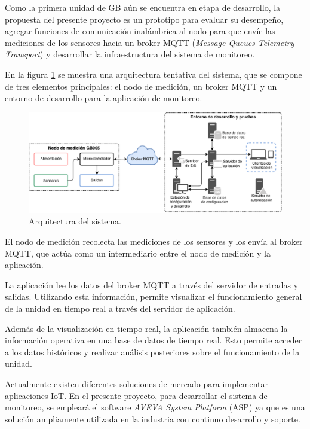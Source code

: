 \documentclass[
11pt, %
]{charter}
\begin{document}
Como la primera unidad de GB aún se encuentra en etapa de desarrollo, la propuesta del presente proyecto es un prototipo para evaluar su desempeño, agregar funciones de comunicación inalámbrica al nodo para que envíe las mediciones de los sensores hacia un broker MQTT (\textit{Message Queues Telemetry Transport}) y desarrollar la infraestructura del sistema de monitoreo.

En la figura \ref{fig:diagBloques} se muestra una arquitectura tentativa del sistema, que se compone de tres elementos principales: el nodo de medición, un broker MQTT y un entorno de desarrollo para la aplicación de monitoreo.

\begin{figure}[htpb]
\centering 
\includegraphics[width=1\textwidth]{./Figuras/diagBloques.pdf}
\caption{Arquitectura del sistema.}
\label{fig:diagBloques}
\end{figure}

El nodo de medición recolecta las mediciones de los sensores y los envía al broker MQTT, que actúa como un intermediario entre el nodo de medición y la aplicación.

La aplicación lee los datos del broker MQTT a través del servidor de entradas y salidas. Utilizando esta información, permite visualizar el funcionamiento general de la unidad en tiempo real a través del servidor de aplicación.

Además de la visualización en tiempo real, la aplicación también almacena la información operativa en una base de datos de tiempo real. Esto permite acceder a los datos históricos y realizar análisis posteriores sobre el funcionamiento de la unidad.

Actualmente existen diferentes soluciones de mercado para implementar aplicaciones IoT. En el presente proyecto, para desarrollar el sistema de monitoreo, se empleará el software \textit{AVEVA System Platform} (ASP) ya que es una solución ampliamente utilizada en la industria con continuo desarrollo y soporte.
\end{document}
